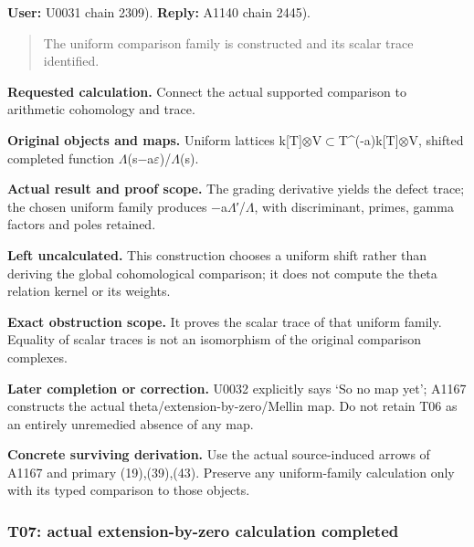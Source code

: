 \documentclass[10pt,a4paper,oneside]{report}
\begin{document}
\textbf{User:} U0031
\protect{} chain 2309).
\textbf{Reply:} A1140
\protect{} chain 2445).

\begin{quote}
The uniform comparison family is constructed and its scalar trace
identified.
\end{quote}

\textbf{Requested calculation.} Connect the actual supported comparison
to arithmetic cohomology and trace.

\textbf{Original objects and maps.} Uniform lattices
k[T]\allowbreak{}\ensuremath{⊗}\allowbreak{}V\allowbreak{}\ensuremath{⊂}\allowbreak{}T\textasciicircum{}(-a)k[T]\allowbreak{}\ensuremath{⊗}\allowbreak{}V,
shifted completed function
\allowbreak{}\ensuremath{Λ}\allowbreak{}(s\allowbreak{}\ensuremath{−}\allowbreak{}a\allowbreak{}\ensuremath{ε}\allowbreak{})/\allowbreak{}\ensuremath{Λ}\allowbreak{}(s).

\textbf{Actual result and proof scope.} The grading derivative yields
the defect trace; the chosen uniform family produces
\allowbreak{}\ensuremath{−}\allowbreak{}a\allowbreak{}\ensuremath{Λ}\allowbreak{}′/\allowbreak{}\ensuremath{Λ}\allowbreak{},
with discriminant, primes, gamma factors and poles retained.

\textbf{Left uncalculated.} This construction chooses a uniform shift
rather than deriving the global cohomological comparison; it does not
compute the theta relation kernel or its weights.

\textbf{Exact obstruction scope.} It proves the scalar trace of that
uniform family. Equality of scalar traces is not an isomorphism of the
original comparison complexes.

\textbf{Later completion or correction.} U0032 explicitly says `So no
map yet'; A1167 constructs the actual theta/extension-by-zero/Mellin
map. Do not retain T06 as an entirely unremedied absence of any map.

\textbf{Concrete surviving derivation.} Use the actual source-induced
arrows of A1167 and primary (19),(39),(43). Preserve any uniform-family
calculation only with its typed comparison to those objects.

\subsubsection{T07: actual extension-by-zero calculation
completed}\label{t07-actual-extension-by-zero-calculation-completed}
\end{document}
